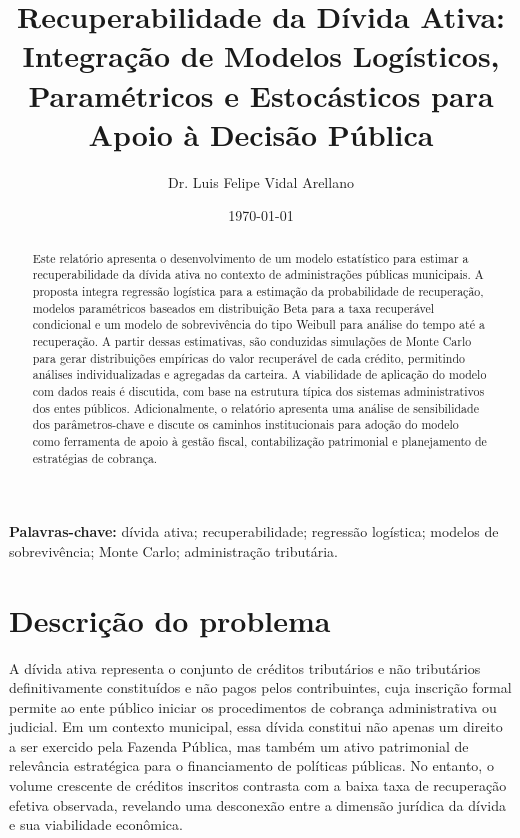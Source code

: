 \documentclass[a4paper,12pt]{article}
\begin{document}
\title{Recuperabilidade da Dívida Ativa: Integração de Modelos Logísticos, Paramétricos e Estocásticos para Apoio à Decisão Pública}
\author{Dr. Luis Felipe Vidal Arellano}
\date{\today}
\maketitle

\begin{abstract}
Este relatório apresenta o desenvolvimento de um modelo estatístico para estimar a recuperabilidade da dívida ativa no contexto de administrações públicas municipais. A proposta integra regressão logística para a estimação da probabilidade de recuperação, modelos paramétricos baseados em distribuição Beta para a taxa recuperável condicional e um modelo de sobrevivência do tipo Weibull para análise do tempo até a recuperação. A partir dessas estimativas, são conduzidas simulações de Monte Carlo para gerar distribuições empíricas do valor recuperável de cada crédito, permitindo análises individualizadas e agregadas da carteira. A viabilidade de aplicação do modelo com dados reais é discutida, com base na estrutura típica dos sistemas administrativos dos entes públicos. Adicionalmente, o relatório apresenta uma análise de sensibilidade dos parâmetros-chave e discute os caminhos institucionais para adoção do modelo como ferramenta de apoio à gestão fiscal, contabilização patrimonial e planejamento de estratégias de cobrança.
\end{abstract}

\noindent\textbf{Palavras-chave:} dívida ativa; recuperabilidade; regressão logística; modelos de sobrevivência; Monte Carlo; administração tributária.

\tableofcontents
\newpage

\section{Descrição do problema}
A dívida ativa representa o conjunto de créditos tributários e não tributários definitivamente constituídos e não pagos pelos contribuintes, cuja inscrição formal permite ao ente público iniciar os procedimentos de cobrança administrativa ou judicial. Em um contexto municipal, essa dívida constitui não apenas um direito a ser exercido pela Fazenda Pública, mas também um ativo patrimonial de relevância estratégica para o financiamento de políticas públicas. No entanto, o volume crescente de créditos inscritos contrasta com a baixa taxa de recuperação efetiva observada, revelando uma desconexão entre a dimensão jurídica da dívida e sua viabilidade econômica.
\end{document}
